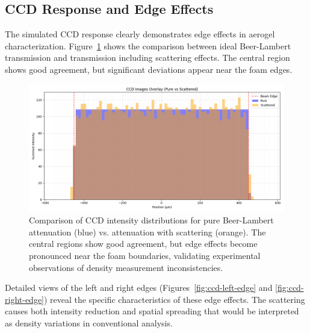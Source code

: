 \documentclass[twocolumn]{aastex701}
\begin{document}
\subsection{CCD Response and Edge Effects}

The simulated CCD response clearly demonstrates edge effects in aerogel characterization. Figure~\ref{fig:ccd-overlay} shows the comparison between ideal Beer-Lambert transmission and transmission including scattering effects. The central region shows good agreement, but significant deviations appear near the foam edges.

\begin{figure}[htbp]
  \centering
  \includegraphics[width=\linewidth]{CCD_Overlay_new.png}
  \caption{Comparison of CCD intensity distributions for pure Beer-Lambert attenuation (blue) vs. attenuation with scattering (orange). The central regions show good agreement, but edge effects become pronounced near the foam boundaries, validating experimental observations of density measurement inconsistencies.}
  \label{fig:ccd-overlay}
\end{figure}

Detailed views of the left and right edges (Figures~\ref{fig:ccd-left-edge} and \ref{fig:ccd-right-edge}) reveal the specific characteristics of these edge effects. The scattering causes both intensity reduction and spatial spreading that would be interpreted as density variations in conventional analysis.
\end{document}
